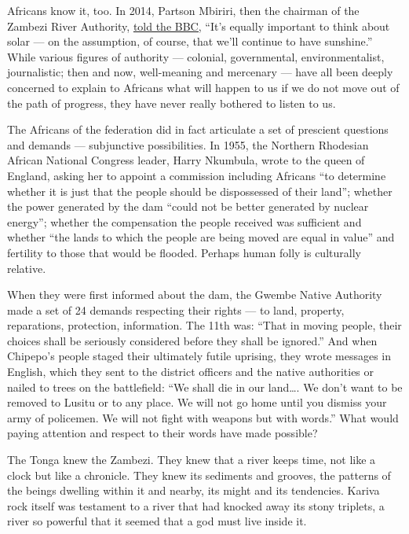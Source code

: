 Africans know it, too. In 2014, Partson Mbiriri, then the chairman of
the Zambezi River Authority,
\href{https://www.bbc.com/news/business-30547267}{told the BBC,} ``It's
equally important to think about solar --- on the assumption, of course,
that we'll continue to have sunshine.'' While various figures of
authority --- colonial, governmental, environmentalist, journalistic;
then and now, well-meaning and mercenary --- have all been deeply
concerned to explain to Africans what will happen to us if we do not
move out of the path of progress, they have never really bothered to
listen to us.

The Africans of the federation did in fact articulate a set of prescient
questions and demands --- subjunctive possibilities. In 1955, the
Northern Rhodesian African National Congress leader, Harry Nkumbula,
wrote to the queen of England, asking her to appoint a commission
including Africans ``to determine whether it is just that the people
should be dispossessed of their land''; whether the power generated by
the dam ``could not be better generated by nuclear energy''; whether the
compensation the people received was sufficient and whether ``the lands
to which the people are being moved are equal in value'' and fertility
to those that would be flooded. Perhaps human folly is culturally
relative.

When they were first informed about the dam, the Gwembe Native Authority
made a set of 24 demands respecting their rights --- to land, property,
reparations, protection, information. The 11th was: ``That in moving
people, their choices shall be seriously considered before they shall be
ignored.'' And when Chipepo's people staged their ultimately futile
uprising, they wrote messages in English, which they sent to the
district officers and the native authorities or nailed to trees on the
battlefield: ``We shall die in our land\ldots{}. We don't want to be
removed to Lusitu or to any place. We will not go home until you dismiss
your army of policemen. We will not fight with weapons but with words.''
What would paying attention and respect to their words have made
possible?

The Tonga knew the Zambezi. They knew that a river keeps time, not like
a clock but like a chronicle. They knew its sediments and grooves, the
patterns of the beings dwelling within it and nearby, its might and its
tendencies. Kariva rock itself was testament to a river that had knocked
away its stony triplets, a river so powerful that it seemed that a god
must live inside it.

